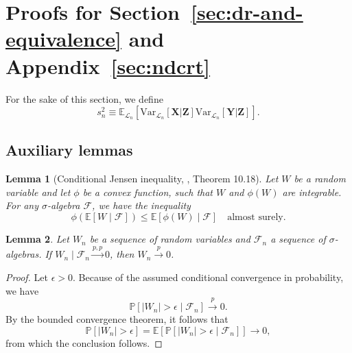 \documentclass[aos]{imsart}
\theoremstyle{plain}
\newtheorem{lemma}{Lemma}
\theoremstyle{remark}
\newcommand{\E}{\mathbb E}								%
\newcommand{\V}{\mathrm{Var}}							%
\renewcommand{\P}{\mathbb{P}}							%
\newcommand{\convp}{\overset p \rightarrow}             %
\newcommand{\prx}{\bm X}								%
\newcommand{\prz}{\bm Z}								%
\newcommand{\pry}{{\bm Y}}								%
\newcommand{\law}{\mathcal L}							%
\newcommand{\convpp}{\overset {p,p} \longrightarrow}    %
\begin{document}
\section{Proofs for Section~\ref{sec:dr-and-equivalence} and Appendix~\ref{sec:ndcrt}}

For the sake of this section, we define
\begin{equation}
	s^2_n \equiv \E_{\law_n}[\V_{\law_n}[\prx|\prz]\V_{\law_n}[\pry|\prz]]. 
\end{equation}

\subsection{Auxiliary lemmas}

\begin{lemma}[Conditional Jensen inequality, \cite{Davidson2003}, Theorem 10.18] \label{lem:conditional-jensen}
	Let $W$ be a random variable and let $\phi$ be a convex function, such that $W$ and $\phi(W)$ are integrable. For any $\sigma$-algebra $\mathcal F$, we have the inequality
	\begin{equation*}
		\phi(\E[W \mid \mathcal F]) \leq  \E[\phi(W) \mid \mathcal F] \quad \text{almost surely}.
	\end{equation*}
\end{lemma}

\begin{lemma} \label{lem:conditional-convergence-to-unconditional}
	Let $W_n$ be a sequence of random variables and $\mathcal F_n$ a sequence of $\sigma$-algebras. If $W_n \mid \mathcal F_n \convpp 0$, then $W_n \convp 0$. 
\end{lemma}

\begin{proof}
	Let $\epsilon > 0$. Because of the assumed conditional convergence in probability, we have
	\begin{equation*}
		\P[|W_n| > \epsilon \mid \mathcal F_n] \convp 0.
	\end{equation*}
	By the bounded convergence theorem, it follows that
	\begin{equation*}
		\P[|W_n| > \epsilon] = \E[\P[|W_n| > \epsilon \mid \mathcal F_n]] \rightarrow 0,
	\end{equation*}
	from which the conclusion follows.
\end{proof}
\end{document}
